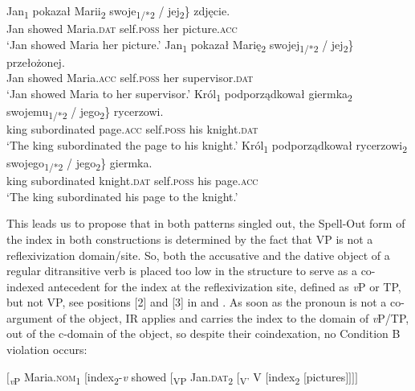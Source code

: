 \documentclass[output=paper,modfonts,nonflat
]{langsci/langscibook}
\begin{document}
\ea \label{ex:witkos:28}
	\ea \label{ex:witkos:28a}
    \gll Jan\textsubscript{1} pokazał Marii\textsubscript{2} \minsp{\{} swoje\textsubscript{1/*2} / jej\textsubscript{2}\} zdjęcie.\\
         Jan showed Maria.\textsc{dat} {} self.\textsc{poss} {} her picture.\textsc{acc}\\
    \glt `Jan showed Maria her picture.'
	\ex \label{ex:witkos:28b}
    \gll Jan\textsubscript{1} pokazał Marię\textsubscript{2} \minsp{\{} swojej\textsubscript{1/*2} / jej\textsubscript{2}\} przełożonej.\\
         Jan showed Maria.\textsc{acc} {} self.\textsc{poss} {} her supervisor.\textsc{dat}\\
    \glt `Jan showed Maria to her supervisor.'
    \ex \label{ex:witkos:28c}
    \gll Król\textsubscript{1} podporządkował giermka\textsubscript{2} \minsp{\{} swojemu\textsubscript{1/*2} / jego\textsubscript{2}\} rycerzowi.\\
         king subordinated page.\textsc{acc} {} self.\textsc{poss} {} his knight.\textsc{dat}\\
    \glt `The king subordinated the page to his knight.'
    \ex\label{ex:witkos:28d}
    \gll Król\textsubscript{1} podporządkował rycerzowi\textsubscript{2} \minsp{\{} swojego\textsubscript{1/*2} / jego\textsubscript{2}\} giermka.\\
         king 	subordinated knight.\textsc{dat} {} self.\textsc{poss} {} his page.\textsc{acc}\\
    \glt `The king subordinated his page to the knight.'
	\z
\z

\noindent This leads us to propose that in both patterns singled out, the Spell-Out form of the index in both constructions is determined by the fact that VP is not a reflexivization domain/site. So, both the accusative and the dative object of a regular ditransitive verb is placed too low in the structure to serve as a co-indexed antecedent for the index at the reflexivization site, defined as \textit{v}P or TP, but not VP, see positions [2] and [3] in  and . As soon as the pronoun is not a co-argument of the object, IR applies and carries the index to the domain of \textit{v}P/TP, out of the c-domain of the object, so despite their coindexation, no Condition B violation occurs:

\ea \label{ex:witkos:29}
$[$\textsubscript{\textit{v}P} Maria.\textsc{nom}\textsubscript{1} [index\textsubscript{2}-\textit{v} showed [\textsubscript{VP} Jan.\textsc{dat}\textsubscript{2} [\textsubscript{V’} V [index\textsubscript{2} [pictures$]]]]$\\
\z
\end{document}
